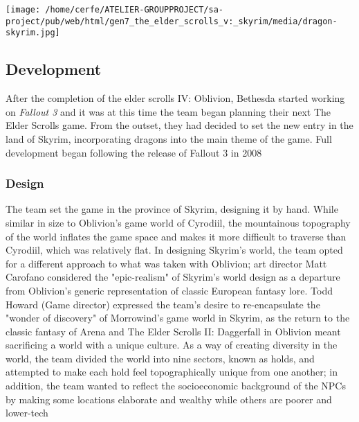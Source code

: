 \documentclass[a4paper,10pt]{book}
\begin{document}
 
 \texttt{[image: /home/cerfe/ATELIER-GROUPPROJECT/sa-project/pub/web/html/gen7\_the\_elder\_scrolls\_v:\_skyrim/media/dragon-skyrim.jpg]}
 
 \subsection{Development }
 
          After the completion of the elder scrolls IV: Oblivion, Bethesda started working on  \textit{Fallout 3 } and it was at this time the team began planning their next The Elder Scrolls game.
           From the outset, they had decided to set the new entry in the land of Skyrim, incorporating dragons into the main theme of the game. Full development began following the release of Fallout 3 in 2008
         
 
 \subsubsection{ Design }
 
          The team set the game in the province of Skyrim, designing it by hand. While similar in size to Oblivion's game world of Cyrodiil, the mountainous topography of the world inflates the game space and makes it more difficult to traverse than Cyrodiil, which was relatively flat.
          In designing Skyrim's world, the team opted for a different approach to what was taken with Oblivion; art director Matt Carofano considered the "epic-realism" of Skyrim's world design as a departure from Oblivion's generic representation of classic European fantasy lore.
          Todd Howard (Game director) expressed the team's desire to re-encapsulate the "wonder of discovery" of Morrowind's game world in Skyrim, as the return to the classic fantasy of Arena and The Elder Scrolls II: Daggerfall in Oblivion meant sacrificing a world with a unique culture.
          As a way of creating diversity in the world, the team divided the world into nine sectors, known as holds, and attempted to make each hold feel topographically unique from one another;
           in addition, the team wanted to reflect the socioeconomic background of the NPCs by making some locations elaborate and wealthy while others are poorer and lower-tech
         
 
 
\end{document}
